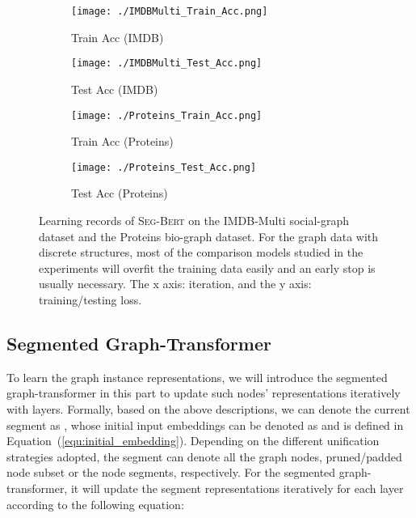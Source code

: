 \documentclass{article}
\newcommand{\our}{\textsc{Seg-Bert}}
\begin{document}
\begin{figure*}
    \centering
    \begin{subfigure}[b]{.23\textwidth}
    	\texttt{[image: ./IMDBMulti\_Train\_Acc.png]}
    	\caption{Train Acc (IMDB)}\label{fig:acc_train}
    \end{subfigure}\hfill
    \begin{subfigure}[b]{.23\textwidth}
    	\texttt{[image: ./IMDBMulti\_Test\_Acc.png]}
    	\caption{Test Acc (IMDB)}\label{fig:acc_test}
    \end{subfigure}\hfill
    \begin{subfigure}[b]{.23\textwidth}
    	\texttt{[image: ./Proteins\_Train\_Acc.png]}
    	\caption{Train Acc (Proteins)}\label{fig:acc_train}
    \end{subfigure}\hfill
    \begin{subfigure}[b]{.23\textwidth}
    	\texttt{[image: ./Proteins\_Test\_Acc.png]}
    	\caption{Test Acc (Proteins)}\label{fig:acc_test}
    \end{subfigure}\vspace{-5pt}
    \caption{Learning records of {\our} on the IMDB-Multi social-graph dataset and the Proteins bio-graph dataset. For the graph data with discrete structures, most of the comparison models studied in the experiments will overfit the training data easily and an early stop is usually necessary. The x axis: iteration, and the y axis: training/testing loss.}\label{fig:graph_bert_protein}
    \vspace{-10pt}
\end{figure*}


\subsection{Segmented Graph-Transformer}




To learn the graph instance representations, we will introduce the segmented graph-transformer in this part to update such nodes' representations iteratively with  layers. Formally, based on the above descriptions, we can denote the current segment as , whose initial input embeddings can be denoted as  and   is defined in Equation~(\ref{equ:initial_embedding}). Depending on the different unification strategies adopted, the segment can denote all the graph nodes, pruned/padded node subset or the node segments, respectively. For the segmented graph-transformer, it will update the segment representations iteratively for each layer  according to the following equation:
\end{document}
